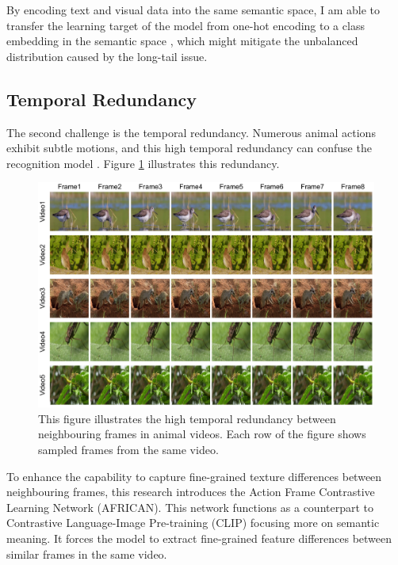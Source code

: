 By encoding text and visual data into the same semantic space, I am able to transfer the learning target of the model from one-hot encoding to a class embedding in the semantic space \parencite{ma2022x}, which might mitigate the unbalanced distribution caused by the long-tail issue. 


\subsection{Temporal Redundancy}
The second challenge is the temporal redundancy. Numerous animal actions exhibit subtle motions, and this high temporal redundancy can confuse the recognition model \parencite{YUAN2018221, li2022uniformer}. Figure \ref{fig:1_3_FrameComparison} illustrates this redundancy. 

\begin{figure}[ht]
    \centering
    \includegraphics[width=1\textwidth]{assets/charts/1_3_FrameComparison}
    \caption[Temporal Redundancy]{This figure illustrates the high temporal redundancy between neighbouring frames in animal videos. Each row of the figure shows sampled frames from the same video.}
    \label{fig:1_3_FrameComparison}
\end{figure}

To enhance the capability to capture fine-grained texture differences between neighbouring frames, this research introduces the Action Frame Contrastive Learning Network (AFRICAN). This network functions as a counterpart to Contrastive Language-Image Pre-training (CLIP) \parencite{radford2021learning} focusing more on semantic meaning. It forces the model to extract fine-grained feature differences between similar frames in the same video. 

